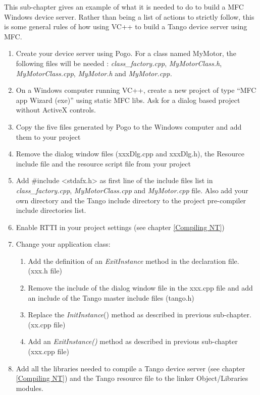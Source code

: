 This sub-chapter gives an example of what it is needed to do to build
a MFC Windows device server. Rather than being a list of actions to
strictly follow, this is some general rules of how using VC++ to build
a Tango device server using MFC.
\begin{enumerate}
\item Create your device server using Pogo. For a class named MyMotor, the
following files will be needed : \emph{class\_factory.cpp}, \emph{MyMotorClass.h},
\emph{MyMotorClass.cpp}, \emph{MyMotor.h} and \emph{MyMotor.cpp.}
\item On a Windows computer running VC++, create a new project of type ``MFC
app Wizard (exe)'' using static MFC libs. Ask for a dialog
based project without ActiveX controls.
\item Copy the five files generated by Pogo to the Windows computer and
add them to your project
\item Remove the dialog window files (xxxDlg.cpp and xxxDlg.h), the Resource
include file and the resource script file from your project
\item Add \#include <stdafx.h> as first line of the include files list in
\emph{class\_factory.cpp}, \emph{MyMotorClass.cpp} and \emph{MyMotor.cpp}
file. Also add your own directory and the Tango include directory
to the project pre-compiler include directories list.
\item Enable RTTI in your project settings (see chapter \ref{Compiling NT})
\item Change your application class: 

\begin{enumerate}
\item Add the definition of an \emph{ExitInstance} method in the declaration
file. (xxx.h file)
\item Remove the include of the dialog window file in the xxx.cpp file and
add an include of the Tango master include files (tango.h)
\item Replace the \emph{InitInstance}() method as described in previous
sub-chapter. (xx.cpp file)
\item Add an \emph{ExitInstance()} method as described in previous sub-chapter
(xxx.cpp file)
\end{enumerate}
\item Add all the libraries needed to compile a Tango device server (see
chapter \ref{Compiling NT}) and the Tango resource file to the linker
Object/Libraries modules.
\end{enumerate}

